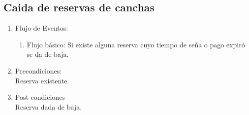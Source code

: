 \documentclass[a4paper,11pt]{article}
\begin{document}
\subsection{Caida de reservas de canchas}
\begin{enumerate}


	\begin{enumerate}
		\item Descripción breve: \\
			Actualización de las reservas automáticamente cuando alguna reserva
            se da de baja por que se cumplió el tiempo de pago.
		\item Actores \\
			Cron.
	
		\item Disparadores: \\
			Dada una hora determina se ejecuta automáticamente.

	\end{enumerate}

	\item Flujo de Eventos: 

	\begin{enumerate}
		\item Flujo básico:
			Si existe alguna reserva cuyo tiempo de seña o pago expiró se da de baja.
	\end{enumerate}

	\item Precondiciones: \\
        Reserva existente.

	\item Post condiciones \\
		Reserva dada de baja.

\end{enumerate}


\end{document}
